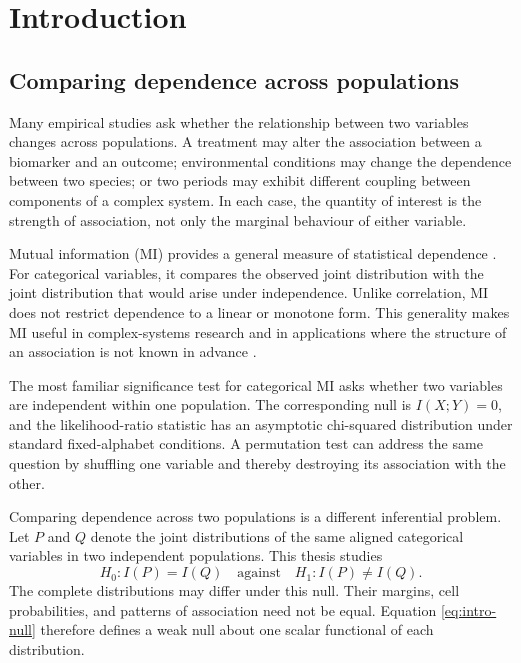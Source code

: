 \chapter{Introduction}
\label{chap:introduction}

\section{Comparing dependence across populations}

Many empirical studies ask whether the relationship between two variables
changes across populations. A treatment may alter the association between a
biomarker and an outcome; environmental conditions may change the dependence
between two species; or two periods may exhibit different coupling between
components of a complex system. In each case, the quantity of interest is the
strength of association, not only the marginal behaviour of either variable.

Mutual information (MI) provides a general measure of statistical dependence
\citep{shannon1948}. For categorical variables, it compares the observed joint
distribution with the joint distribution that would arise under independence.
Unlike correlation, MI does not restrict dependence to a linear or monotone
form. This generality makes MI useful in complex-systems research and in
applications where the structure of an association is not known in advance
\citep{brillinger2004,lizier2014}.

The most familiar significance test for categorical MI asks whether two
variables are independent within one population. The corresponding null is
\(
I(X;Y)=0
\), and the likelihood-ratio statistic has an asymptotic chi-squared
distribution under standard fixed-alphabet conditions. A permutation test can
address the same question by shuffling one variable and thereby destroying its
association with the other.

Comparing dependence across two populations is a different inferential
problem. Let \(P\) and \(Q\) denote the joint distributions of the same aligned
categorical variables in two independent populations. This thesis studies
\begin{equation}
  H_0:I(P)=I(Q)
  \quad\text{against}\quad
  H_1:I(P)\ne I(Q).
  \label{eq:intro-null}
\end{equation}
The complete distributions may differ under this null. Their margins, cell
probabilities, and patterns of association need not be equal. Equation
\eqref{eq:intro-null} therefore defines a weak null about one scalar functional
of each distribution.

